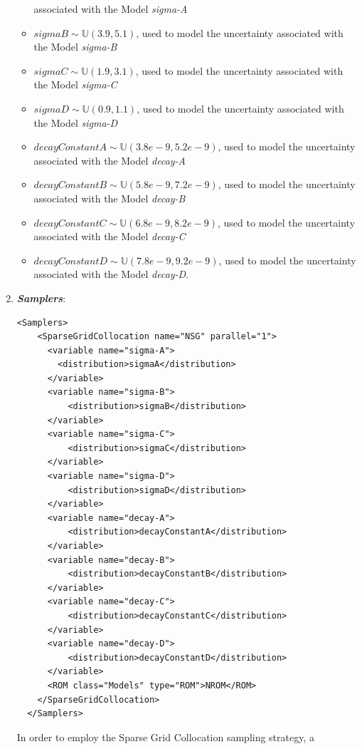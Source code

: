 \begin{enumerate}
\begin{itemize}
    associated with  the Model \textit{sigma-A}
    \item $sigmaB \sim \mathbb{U}(3.9,5.1)$, used to model the uncertainty 
    associated with  the Model \textit{sigma-B}
    \item $sigmaC \sim \mathbb{U}(1.9,3.1)$, used to model the uncertainty 
    associated with  the Model \textit{sigma-C}
    \item $sigmaD \sim \mathbb{U}(0.9,1.1)$, used to model the uncertainty 
    associated with  the Model \textit{sigma-D}
    \item  $decayConstantA \sim \mathbb{U}(3.8e-9,5.2e-9)$,  used to 
    model the uncertainty 
    associated with  the Model \textit{decay-A}
    \item  $decayConstantB \sim \mathbb{U}(5.8e-9,7.2e-9)$,  used to 
    model the uncertainty 
    associated with  the Model \textit{decay-B}
    \item  $decayConstantC \sim \mathbb{U}(6.8e-9,8.2e-9)$,  used to 
    model the uncertainty 
    associated with  the Model \textit{decay-C}
    \item  $decayConstantD \sim \mathbb{U}(7.8e-9,9.2e-9)$,  used to 
    model the uncertainty 
    associated with  the Model \textit{decay-D}.
  \end{itemize}
   \item \textbf{\textit{Samplers}}:
\begin{lstlisting}[style=XML,morekeywords={arg,extension,pauseAtEnd,overwrite}]
  <Samplers>
    <SparseGridCollocation name="NSG" parallel="1">
      <variable name="sigma-A">
        <distribution>sigmaA</distribution>
      </variable>
      <variable name="sigma-B">
          <distribution>sigmaB</distribution>
      </variable>
      <variable name="sigma-C">
          <distribution>sigmaC</distribution>
      </variable>
      <variable name="sigma-D">
          <distribution>sigmaD</distribution>
      </variable>
      <variable name="decay-A">
          <distribution>decayConstantA</distribution>
      </variable>
      <variable name="decay-B">
          <distribution>decayConstantB</distribution>
      </variable>
      <variable name="decay-C">
          <distribution>decayConstantC</distribution>
      </variable>
      <variable name="decay-D">
          <distribution>decayConstantD</distribution>
      </variable>
      <ROM class="Models" type="ROM">NROM</ROM>
    </SparseGridCollocation>
  </Samplers> 
\end{lstlisting}
  In order to employ the Sparse Grid Collocation sampling strategy, a 

\end{enumerate}
